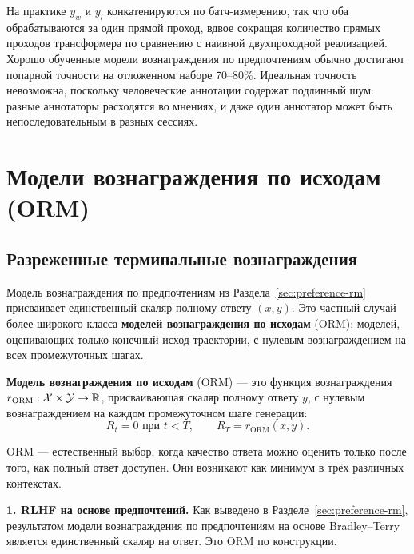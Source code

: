 На практике $y_w$ и $y_l$ конкатенируются по батч-измерению, так что оба обрабатываются за один прямой проход, вдвое сокращая количество прямых проходов трансформера по сравнению с наивной двухпроходной реализацией. Хорошо обученные модели вознаграждения по предпочтениям обычно достигают попарной точности на отложенном наборе 70--80\%. Идеальная точность невозможна, поскольку человеческие аннотации содержат подлинный шум: разные аннотаторы расходятся во мнениях, и даже один аннотатор может быть непоследовательным в разных сессиях.

\section{Модели вознаграждения по исходам (ORM)}
\label{sec:orm}

\subsection{Разреженные терминальные вознаграждения}

Модель вознаграждения по предпочтениям из Раздела~\ref{sec:preference-rm} присваивает единственный скаляр полному ответу $(x, y)$. Это частный случай более широкого класса \textbf{моделей вознаграждения по исходам} (ORM): моделей, оценивающих только конечный исход траектории, с нулевым вознаграждением на всех промежуточных шагах.

\begin{definition}
\label{def:orm}
\textbf{Модель вознаграждения по исходам} (ORM) --- это функция вознаграждения $r_{\mathrm{ORM}} : \mathcal{X} \times \mathcal{Y} \to \mathbb{R}$, присваивающая скаляр полному ответу $y$, с нулевым вознаграждением на каждом промежуточном шаге генерации:
\[
R_t = 0 \mbox{ при } t < T, \qquad R_T = r_{\mathrm{ORM}}(x, y).
\]
\end{definition}

ORM --- естественный выбор, когда качество ответа можно оценить только после того, как полный ответ доступен. Они возникают как минимум в трёх различных контекстах.

\textbf{1. RLHF на основе предпочтений.} Как выведено в Разделе~\ref{sec:preference-rm}, результатом модели вознаграждения по предпочтениям на основе Bradley--Terry является единственный скаляр на ответ. Это ORM по конструкции.

